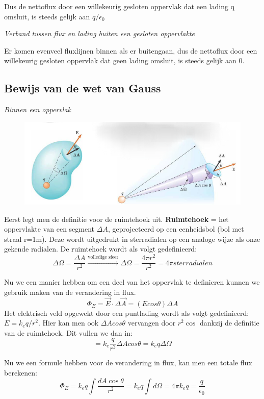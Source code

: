 \documentclass[12pt,a4paper]{article}
\begin{document}
   	Dus de nettoflux door een willekeurig gesloten oppervlak dat een lading q omsluit, is steeds gelijk aan $q/\epsilon_0$
   	
   	\textit{Verband tussen flux en lading buiten een gesloten oppervlakte}
   	
   	Er komen evenveel fluxlijnen binnen als er buitengaan, dus de nettoflux door een willekeurig gesloten oppervlak dat geen lading omsluit, is steeds gelijk aan 0.
   	
   	\subsection{Bewijs van de wet van Gauss}
   	\textit{Binnen een oppervlak}
   	\begin{figure}[h]
   		\centering
   		\includegraphics[width=0.7\linewidth]{bewijs_gauss}
   		\label{fig:bewijsgauss}
   	\end{figure}
   Eerst legt men de definitie voor de ruimtehoek uit. \textbf{Ruimtehoek} = het oppervlakte van een segment $\Delta A$, geprojecteerd op een eenheidsbol (bol met straal r=1m). Deze wordt uitgedrukt in sterradialen op een analoge wijze als onze gekende radialen. De ruimtehoek wordt als volgt gedefinieerd:
   \[\Delta\Omega = \frac{\Delta A}{r^2} \xrightarrow{\text{volledige sfeer}} \Delta\Omega = \frac{4\pi r^2}{r^2} = 4\pi sterradialen\]
   
   Nu we een manier hebben om een deel van het oppervlak te definieren kunnen we gebruik maken van de verandering in flux.
   \[\Phi_E = \vec{E}\cdot\Delta\vec{A} = (Ecos\theta)\Delta A\]
   Het elektrisch veld opgewekt door een puntlading wordt als volgt gedefinieerd: \(E = k_eq/r^2\). Hier kan men ook $\Delta A cos\theta$ vervangen door $r^2\cos$ dankzij de definitie van de ruimtehoek. Dit vullen we dan in:
   \[= k_e\frac{q}{r^2}\Delta A cos\theta = k_eq\Delta\Omega\]
   
   Nu we een formule hebben voor de verandering in flux, kan men een totale flux berekenen: 
   \[\Phi_E = k_eq\int \frac{dA\cos\theta}{r^2} = k_eq\int d\Omega = 4\pi k_e q = \frac{q}{\epsilon_0}\]
   
\end{document}
